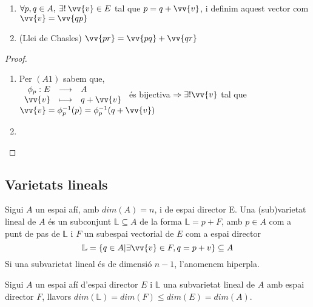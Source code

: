 \begin{lem}\begin{enumerate}
	\item $\forall p,q\in A,\: \exists !\: \vv{v}\in E$ tal que $p=q+\vv{v}$, i definim aquest vector com $\vv{v}=\vv{qp}$
	\item (Llei de Chasles) $\vv{pr}=\vv{pq}+\vv{qr}$
\end{enumerate}\end{lem}
\begin{proof}\begin{enumerate}
	\item Per $(A1)$ sabem que, \\
	$\begin{array}{rcl}
		\phi_{p} :E	& \longrightarrow	& A 		\\
		\vv{v}		& \longmapsto		& q+\vv{v}	\\
	\end{array}$ és bijectiva $\Rightarrow \exists ! \vv{v}$ tal que $\vv{v}=\phi_{p}^{-1}(p)=\phi_{p}^{-1}(q+\vv{v})$
	\item 
\end{enumerate}\end{proof}

\subsection{Varietats lineals}

\begin{defn}
	Sigui $A$ un espai afí, amb $dim(A)=n$, i de espai director E. Una (sub)varietat lineal de $A$ és un subconjunt $\mathbb{L}\subseteq A$ de la forma $\mathbb{L}=p+F$, amb $p\in A$ com a punt de pas de $\mathbb{L}$ i $F$ un subespai vectorial de $E$ com a espai director
	$$\mathbb{L}=\{ q\in A |\exists \vv{v}\in F, q = p + v\} \subseteq A$$
	Si una subvarietat lineal és de dimensió $n-1$, l'anomenem hiperpla.
\end{defn}

\begin{lem}
	Sigui $A$ un espai afí d'espai director $E$ i $\mathbb{L}$ una subvarietat lineal de $A$ amb espai director $F$, llavors $dim(\mathbb{L})=dim(F)\leq dim(E)=dim(A)$.
\end{lem}


